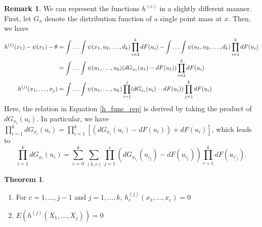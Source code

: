 \documentclass{article}
\theoremstyle{definition}
\newtheorem{theorem}{Theorem}
\numberwithin{Def}{section}
\newtheorem{Rmk}{Remark}
\begin{document}
\begin{Rmk}
We can represent the functions $h^{(c)}$ in a slightly different manner. First, let $G_x$ denote the distribution function of a single point mass at $x$. Then, we have 
\begin{align}
    h^{(1)}(x_1) - \psi(x_1) - \theta  &= \int \dotsc \int \psi(x_1, u_2, \dotsc, d_k)\prod_{i=2}^k dF(u_i) - \int \dotsc \int \psi(u_1, u_2, \dotsc, d_k)\prod_{i=1}^k dF(u_i) \notag \\
    &= \int \dotsc \int \psi(u_1, \dotsc, u_k)(dG_{x_1}(u_1) - dF(u_1))\prod_{i=2}^k dF(u_i) \notag \\
    h^{(j)}(x_1, \dotsc, x_j) &= \int \dotsc \int \psi(u_1, \dotsc, u_k) \prod_{i=1}^j(dG_{x_i}(u_i) - dF(u_i))\prod_{j+1}^kdF(u_i) \label{h_func_rep}
\end{align}
Here, the relation in Equation \ref{h_func_rep} is derived by taking the product of $dG_{x_i}(u_i)$. In particular, we have $\prod_{i=1}^kdG_{x_i}(u_i) = \prod_{i=1}^k\left[(dG_{x_i}(u_i) - dF(u_i)) + dF(u_i) \right]$, which leads to $$\prod_{i=1}^kdG_{x_i}(u_i) = \sum_{c=0}^k \sum_{(k,c)}\prod_{j=1}^c\left(dG_{x_{i_j}}(u_{i_j}) - dF(u_{i_j})\right)\prod_{c+1}^k dF(u_{i'_j}).$$
\end{Rmk}

\begin{theorem}
    \begin{enumerate} [label = (\roman*)]
        \item For $c = 1, \dotsc, j-1$ and $j = 1, \dotsc, k$, $h_c^{(j)}(x_1, \dotsc, x_c) = 0$
        \item $E(h^{(j)}(X_1, \dotsc, X_j)) = 0$
    \end{enumerate}
    \end{theorem}
    
\end{document}
